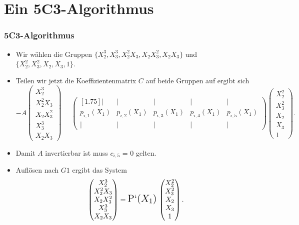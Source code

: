 \documentclass[11pt]{beamer}
\theoremstyle{custom}
\theoremstyle{custom}
\begin{document}
	\section{Ein 5C3-Algorithmus}
	\begin{frame}
		\frametitle{5C3-Algorithmus}
		\begin{itemize}
			\item Wir wählen die Gruppen $\{X_{2}^3,X_{3}^3,X_{2}^2X_{3},X_{2}X_{3}^2,X_{2}X_{3}\}$ und $\{X_{2}^2,X_{3}^2,X_{2},X_{3},1\}$.\\ \pause
		
		\item Teilen wir jetzt die Koeffizientenmatrix $C$ auf beide Gruppen auf ergibt sich 
		\begin{equation*}
			-A
			\begin{pmatrix}
				X_{2}^3\\
				X_{2}^2X_{3}\\
				X_{2}X_{3}^2\\
				X_{3}^3\\
				X_{2}X_{3}
			\end{pmatrix}
			=
			\begin{pmatrix}[1.75]
				\vert & \vert & \vert & \vert & \vert \\
				p_{i,1}(X_{1})&p_{i,2}(X_{1})& p_{i,3}(X_{1})& p_{i,4}(X_{1})& p_{i,5}(X_{1})\\
				\vert & \vert & \vert & \vert & \vert
			\end{pmatrix}
			\begin{pmatrix}
				X_{2}^2\\
				X_{3}^2\\
				X_{2}\\
				X_{3}\\
				1
			\end{pmatrix}.
		\end{equation*}
		\end{itemize}
	\end{frame}
	\begin{frame}
		\begin{itemize}
			\item Damit $A$ invertierbar ist muss $c_{i,5}$ = 0 gelten.
			\item Auflösen nach $G1$ ergibt das System
			\begin{equation*}
				\begin{pmatrix}
					X_{2}^3\\
					X_{2}^2X_{3}\\
					X_{2}X_{3}^2\\
					X_{3}^3\\
					X_{2}X_{3}
				\end{pmatrix}
				=
				{\Large \text{P`($X_1$)}} \,
				\begin{pmatrix}
					X_{2}^2\\
					X_{3}^2\\
					X_{2}\\
					X_{3}\\
					1
				\end{pmatrix}.
			\end{equation*}
		\end{itemize}
	\end{frame}
\end{document}
